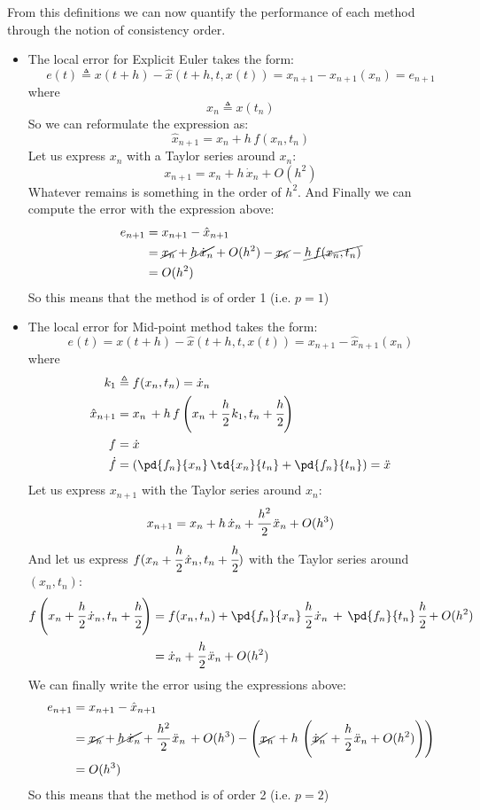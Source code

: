 From this definitions we can now quantify the performance of each method through the notion of consistency order.
\begin{itemize}
\item The local error for Explicit Euler takes the form:
\[e(t) \triangleq x(t+h) - \hat{x}(t+h, t, x(t)) = x_{n+1} - \hat{x}_{n+1}(x_n) = e_{n+1}\]
where 
\[x_n \triangleq x(t_n)\]
So we can reformulate the expression as:
\[\hat{x}_{n+1} = x_n + h\,f(x_n, t_n)\]
Let us express $x_n$ with a Taylor series around $x_n$:
\[x_{n+1} = x_n + h\,\dot{x}_n + O(h^2)\]
Whatever remains is something in the order of $h^2$.
And Finally we can compute the error with the expression above:
\begin{align*}
e_{n+1} &= x_{n+1} - \hat{x}_{n+1}\\
&= \cancel{x_n} + \cancel{h\,\dot{x}_n} + O(h^2) - \cancel{x_n} - \cancel{h\,f(x_n,t_n)}\\
&= O(h^2)
\end{align*}
So this means that the method is of order 1 (i.e. $p = 1$)

\item The local error for Mid-point method takes the form:
\[e(t) = x(t+h) - \hat{x}(t+h, t, x(t)) = x_{n+1} - \hat{x}_{n+1}(x_n)\]
where
\begin{align*}
k_1 &\triangleq f(x_n, t_n) = \dot{x}_n\\
\hat{x}_{n+1} &= x_n\,+h\,f\left(x_n+\cfrac{h}{2}\,k_1, t_n + \cfrac{h}{2}\right)\\
f &= \dot{x}\\
\dot{f} &= \left(\pd{f_n}{x_n}\,\td{x_n}{t_n} + \pd{f_n}{t_n}\right) = \ddot{x}
\end{align*}
Let us express $x_{n+1}$ with the Taylor series around $x_n$:
\[x_{n+1} = x_n + h\,\dot{x}_n + \cfrac{h^2}{2}\,\ddot{x}_n + O(h^3)\]
And let us express $f(x_n+\cfrac{h}{2}\,\dot{x}_n, t_n + \cfrac{h}{2})$ with the Taylor series around $(x_n, t_n)$:
\begin{align*}
f\left(x_n+\cfrac{h}{2}\,\dot{x}_n, t_n + \cfrac{h}{2}\right) &=f(x_n, t_n) + \pd{f_n}{x_n}\,\cfrac{h}{2}\,\dot{x}_n \, +\, \pd{f_n}{t_n}\,\cfrac{h}{2} + O(h^2)\\
&= \dot{x}_n + \cfrac{h}{2}\,\ddot{x}_n + O(h^2)
\end{align*}
We can finally write the error using the expressions above:
\begin{align*}
e_{n+1} &= x_{n+1} - \hat{x}_{n+1} \\
&= \cancel{x_n} + \cancel{h\,\dot{x}_n} + \cfrac{h^2}{2}\,\ddot{x}_n\,+O(h^3) - \left(\cancel{x_n}\,+ h\,\left(\cancel{\dot{x}_n}\,+\cfrac{h}{2}\,\ddot{x}_n + O(h^2) \right)\right)\\
&= O(h^3)
\end{align*}
So this means that the method is of order 2 (i.e. $p = 2$)
\end{itemize}